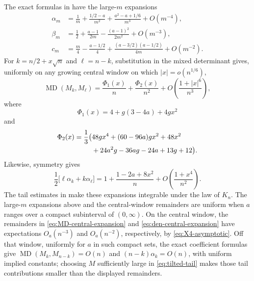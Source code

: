 \documentclass[11pt,a4paper]{amsart}
\numberwithin{equation}{section}
\theoremstyle{plain}
\theoremstyle{definition}
\newcommand{\MD}{\operatorname{MD}}
\begin{document}
The exact formulas in  have the large-\(m\) expansions
\begin{align}
 \alpha_m&=\frac1m+\frac{1/2-a}{m^2}
 +\frac{a^2-a+1/6}{m^3}+O(m^{-4}),\label{eq:alpha-asymptotic}\\
 \beta_m&=\frac12+\frac{a-1}{2m}
 -\frac{(a-1)^2}{2m^2}+O(m^{-3}),\label{eq:beta-asymptotic}\\
 c_m&=\frac m4-\frac{a-1/2}{4}
 +\frac{(a-3/2)(a-1/2)}{4m}+O(m^{-2}).\label{eq:c-asymptotic}
\end{align}
For \(k=n/2+x\sqrt n\) and \(\ell=n-k\), substitution in the mixed determinant
gives, uniformly on any growing central window on which
\(|x|=o(n^{1/6})\),
\begin{equation}\label{eq:MD-central-expansion}
 \MD(M_k,M_\ell)
 =\frac{\Phi_1(x)}n+\frac{\Phi_2(x)}{n^2}
 +O\left(\frac{1+|x|^6}{n^3}\right),
\end{equation}
where
\begin{equation}\label{eq:Phi1}
 \Phi_1(x)=4+g(3-4a)+4gx^2
\end{equation}
and
\begin{align}
 \Phi_2(x)=\frac13\bigl(&48gx^4+(60-96a)gx^2+48x^2\notag\\
 &+24a^2g-36ag-24a+13g+12\bigr).\label{eq:Phi2}
\end{align}
Likewise, symmetry gives
\begin{equation}\label{eq:den-central-expansion}
 \frac12\bigl[\ell\alpha_k+k\alpha_\ell\bigr]
 =1+\frac{1-2a+8x^2}{n}
 +O\left(\frac{1+x^4}{n^2}\right).
\end{equation}
The tail estimates in  make these expansions
integrable under the law of \(K_n\).  The large-\(m\) expansions above and the
central-window remainders are uniform when \(a\) ranges over a compact
subinterval of \((0,\infty)\).  On the central window, the remainders in
\eqref{eq:MD-central-expansion} and \eqref{eq:den-central-expansion} have
expectations \(O_a(n^{-3})\) and \(O_a(n^{-2})\), respectively, by
\eqref{eq:X4-asymptotic}.  Off that window, uniformly for \(a\) in such compact
sets, the exact coefficient formulas give \(\MD(M_k,M_{n-k})=O(n)\) and
\((n-k)\alpha_k=O(n)\), with uniform implied constants; choosing \(M\)
sufficiently large in \eqref{eq:tilted-tail} makes those tail contributions
smaller than the displayed remainders.
\end{document}
